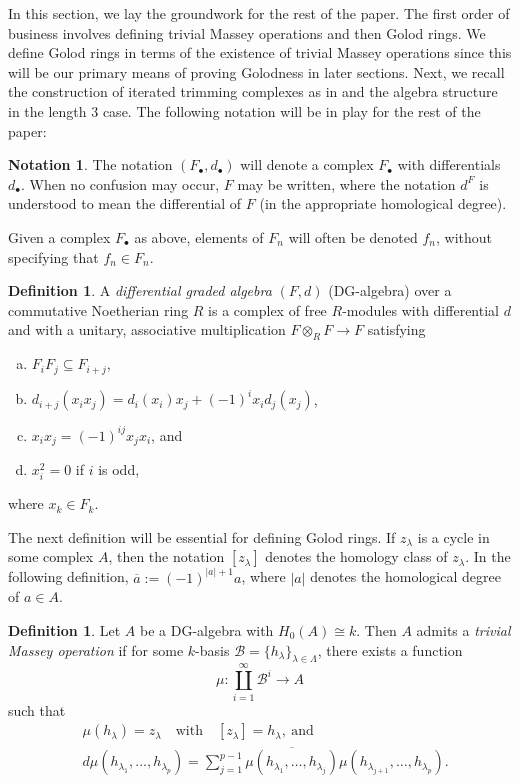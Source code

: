 \documentclass[10pt]{amsart}
\theoremstyle{definition}
\newtheorem{definition}[theorem]{Definition}
\newtheorem{notation}[theorem]{Notation}
\theoremstyle{remark}
\newtheorem{the context}[theorem]{The Context}
\numberwithin{equation}{theorem}
\numberwithin{equation}{section}
\newcommand{\cat}[1]{\mathcal{#1}}
\begin{document}
In this section, we lay the groundwork for the rest of the paper. The first order of business involves defining trivial Massey operations and then Golod rings. We define Golod rings in terms of the existence of trivial Massey operations since this will be our primary means of proving Golodness in later sections. Next, we recall the construction of iterated trimming complexes as in \cite{vandebogert2020trimming} and the algebra structure in the length $3$ case. The following notation will be in play for the rest of the paper:


\begin{notation}
The notation $(F_\bullet , d_\bullet)$ will denote a complex $F_\bullet$ with differentials $d_\bullet$. When no confusion may occur, $F$ may be written, where the notation $d^F$ is understood to mean the differential of $F$ (in the appropriate homological degree).

Given a complex $F_\bullet$ as above, elements of $F_n$ will often be denoted $f_n$, without specifying that $f_n \in F_n$.
\end{notation}

\begin{definition}\label{def:dga}
A \emph{differential graded algebra} $(F,d)$ (DG-algebra) over a commutative Noetherian ring $R$ is a complex of free $R$-modules with differential $d$ and with a unitary, associative multiplication $F \otimes_R F \to F$ satisfying
\begin{enumerate}[(a)]
    \item $F_i F_j \subseteq F_{i+j}$,
    \item $d_{i+j} (x_i x_j) = d_i (x_i) x_j + (-1)^i x_i d_j (x_j)$,
    \item $x_i x_j = (-1)^{ij} x_j x_i$, and
    \item $x_i^2 = 0$ if $i$ is odd,
\end{enumerate}
where $x_k \in F_k$.
\end{definition}

The next definition will be essential for defining Golod rings. If $z_\lambda$ is a cycle in some complex $A$, then the notation $[z_\lambda]$ denotes the homology class of $z_\lambda$. In the following definition, $\overline{a} := (-1)^{|a|+1} a$, where $|a|$ denotes the homological degree of $a \in A$.  

\begin{definition}
Let $A$ be a DG-algebra with $H_0 (A) \cong k$. Then $A$ admits a \emph{trivial Massey operation} if for some $k$-basis $\mathcal{B} = \{ h_\lambda \}_{\lambda \in \Lambda}$, there exists a function
$$\mu : \coprod_{i=1}^\infty \cat{B}^i \to A$$
such that
\begingroup\allowdisplaybreaks
\begin{align*}
    &\mu ( h_\lambda) = z_\lambda \quad \textrm{with} \quad [z_\lambda] = h_\lambda, \ \textrm{and} \\
    &d \mu (h_{\lambda_1} , \dots , h_{\lambda_p} ) = \sum_{j=1}^{p-1} \overline{\mu (h_{\lambda_1} , \dots , h_{\lambda_j})} \mu (h_{\lambda_{j+1}} , \dots , h_{\lambda_p}). 
\end{align*}
\endgroup
\end{definition}
\end{document}
